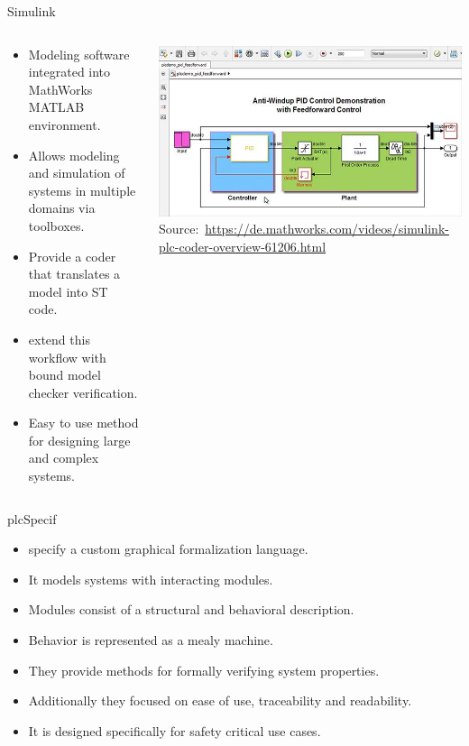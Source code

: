 \documentclass[18pt]{beamer}
\begin{document}
\begin{frame}{Simulink}
\begin{columns}
    \begin{column}{0.5\textwidth}
        \begin{itemize}
            \item Modeling software integrated into MathWorks MATLAB environment.
            \item Allows modeling and simulation of systems in multiple domains via toolboxes.
            \item Provide a coder that translates a model into ST code.
            \item \cite{7535242} extend this workflow with bound model checker verification.
            \item Easy to use method for designing large and complex systems.
        \end{itemize}
    \end{column}
    \begin{column}{0.5\textwidth}
        \includegraphics[width=\textwidth]{./figures/simulink.jpg}
       {\footnotesize  Source:~\url{https://de.mathworks.com/videos/simulink-plc-coder-overview-61206.html}}
    \end{column}
\end{columns}
\end{frame}

\begin{frame}{plcSpecif}
\begin{itemize}
    \item \cite{7819191} specify a custom graphical formalization language.
    \item It models systems with interacting modules.
    \item Modules consist of a structural and behavioral description.
    \item Behavior is represented as a mealy machine.
    \item They provide methods for formally verifying system properties.
    \item Additionally they focused on ease of use, traceability and readability.
    \item It is designed specifically for safety critical use cases.
\end{itemize}
\end{frame}
\end{document}
